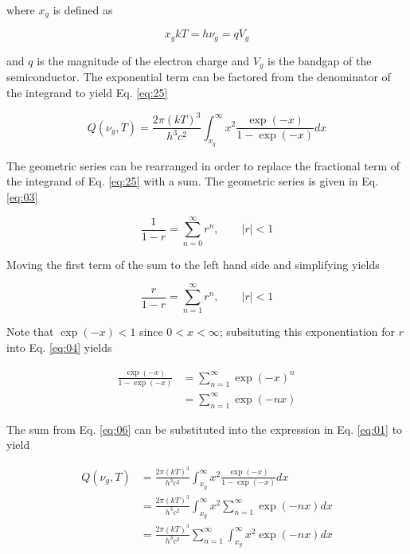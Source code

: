 \documentclass[letterpaper,12pt]{article}
\begin{document}
\noindent where $x_{g}$ is defined as

\begin{equation} \label{eq:02}
x_{g}kT = h \nu_{g} = q V_{g}
\end{equation}

\noindent and $q$ is the magnitude of the electron charge and $V_{g}$ is the bandgap of the semiconductor. The exponential term can be factored from the denominator of the integrand to yield Eq. \ref{eq:25}

\begin{equation} \label{eq:25}
Q(\nu_{g}, T) = \frac{2\pi (kT)^{3}}{h^{3} c^{2}} \int_{x_{g}}^{\infty} x^{2} \frac{\exp(-x)}{1 - \exp(-x)} dx
\end{equation}

The geometric series can be rearranged in order to replace the fractional term of the integrand of Eq. \ref{eq:25} with a sum. The geometric series is given in Eq. \ref{eq:03}

\begin{equation} \label{eq:03}
\frac{1}{1-r} = \sum_{n = 0}^{\infty} r^{n}, \qquad |r| < 1
\end{equation}

\noindent Moving the first term of the sum to the left hand side and simplifying yields

\begin{equation} \label{eq:04}
\frac{r}{1-r} = \sum_{n = 1}^{\infty} r^{n}, \qquad |r| < 1
\end{equation}

\noindent Note that $\exp(-x) < 1$ since $0 < x < \infty$; subsituting this exponentiation for $r$ into Eq. \ref{eq:04} yields

\begin{align} \label{eq:06}
\frac{\exp(-x)}{1 - \exp(-x)} &= \sum_{n = 1}^{\infty} \exp(-x)^{n} \\
 &= \sum_{n = 1}^{\infty} \exp(-nx)
\end{align}

The sum from Eq. \ref{eq:06} can be substituted into the expression in Eq. \ref{eq:01} to yield

\begin{align} \label{eq:07}
Q(\nu_{g}, T) &= \frac{2\pi (kT)^{3}}{h^{3} c^{2}} \int_{x_{g}}^{\infty} x^{2} \frac{\exp(-x)}{1 - \exp(-x)} dx \\
 &= \frac{2\pi (kT)^{3}}{h^{3} c^{2}} \int_{x_{g}}^{\infty} x^{2} \sum_{n = 1}^{\infty} \exp(-nx) dx \\
 &= \frac{2\pi (kT)^{3}}{h^{3} c^{2}} \sum_{n = 1}^{\infty} \int_{x_{g}}^{\infty} x^{2} \exp(-nx) dx
\end{align}
\end{document}
